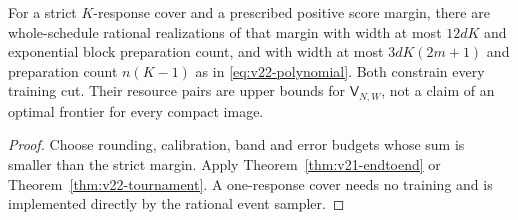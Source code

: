 \begin{corollary}
\label{cor:v22-two-realizations}
For a strict $K$-response cover and a prescribed positive score margin,
there are whole-schedule rational realizations of that margin with
width at most $12dK$ and exponential block preparation count, and with
width at most $3dK(2m+1)$ and preparation count $n(K-1)$ as in
\eqref{eq:v22-polynomial}. Both constrain every training cut. Their
resource pairs are upper bounds for $\mathsf V_{N,W}$, not a claim of
an optimal frontier for every compact image.
\end{corollary}
\begin{proof}
Choose rounding, calibration, band and error budgets whose sum is
smaller than the strict margin. Apply Theorem~\ref{thm:v21-endtoend}
or Theorem~\ref{thm:v22-tournament}. A one-response cover needs no
training and is implemented directly by the rational event sampler.
\end{proof}
